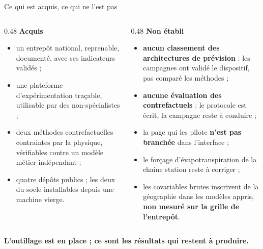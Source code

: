\documentclass[aspectratio=169,11pt]{beamer}
\begin{document}
\begin{frame}{Ce qui est acquis, ce qui ne l'est pas}

\begin{columns}[T]
\begin{column}{0.48\textwidth}
{\color{vertsobre}\bfseries Acquis}
\vspace{0.3em}
\footnotesize
\begin{itemize}\itemsep0.3em
  \item un entrepôt national, reprenable, documenté, avec ses indicateurs validés ;
  \item une plateforme d'expérimentation traçable, utilisable par des non-spécialistes ;
  \item deux méthodes contrefactuelles contraintes par la physique, vérifiables contre un
        modèle métier indépendant ;
  \item quatre dépôts publics ; les deux du socle installables depuis une machine vierge.
\end{itemize}
\end{column}

\begin{column}{0.48\textwidth}
{\color{rougesobre}\bfseries Non établi}
\vspace{0.3em}
\footnotesize
\begin{itemize}\itemsep0.3em
  \item \textbf{aucun classement des architectures de prévision} : les campagnes ont validé le dispositif,
        pas comparé les méthodes ;
  \item \textbf{aucune évaluation des contrefactuels} : le protocole est écrit, la campagne
        reste à conduire ;
  \item la page qui les pilote \textbf{n'est pas branchée} dans l'interface ;
  \item le forçage d'évapotranspiration de la chaîne station reste à corriger ;
  \item les covariables brutes inscrivent de la géographie dans les modèles appris,
        \textbf{non mesuré sur la grille de l'entrepôt}.
\end{itemize}
\end{column}
\end{columns}

\vspace{0.3cm}
\begin{center}\small
{\color{bleuprofond}\bfseries L'outillage est en place ; ce sont les résultats qui restent à
produire.}
\end{center}
\end{frame}
\end{document}
